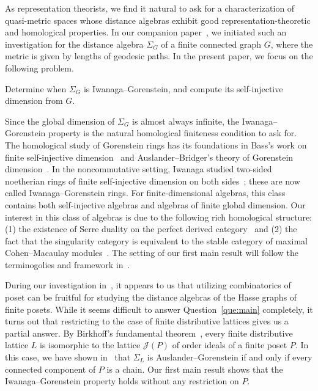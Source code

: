 \documentclass[a4paper,leqno]{amsart}
\begin{document}
As representation theorists, we find it natural to ask for a characterization of quasi-metric spaces whose distance algebras exhibit good representation-theoretic and homological properties. 
In our companion paper~\cite{CX26}, we initiated such an investigation for the distance algebra $\Sigma_G$ of a finite connected graph $G$, where the metric is given by lengths of geodesic paths. 
In the present paper, we focus on the following problem.

\begin{que}\label{que:main}
Determine when $\Sigma_G$ is Iwanaga--Gorenstein, and compute its self-injective dimension from $G$.
\end{que}

Since the global dimension of $\Sigma_G$ is almost always infinite, the Iwanaga--Gorenstein property is the natural homological finiteness condition to ask for. The homological study of Gorenstein rings has its foundations in Bass's work on finite self-injective dimension~\cite{Bas63} and Auslander--Bridger's theory of Gorenstein dimension~\cite{AB69}.  In the noncommutative setting, Iwanaga studied two-sided noetherian rings of finite self-injective dimension on both sides~\cite{Iwa79}; these are now called Iwanaga--Gorenstein rings. 
For finite-dimensional algebras, this class contains both self-injective algebras and algebras of finite global dimension.  Our interest in this class of algebras is due to the following rich homological structure: (1) the existence of Serre duality on the perfect derived category~\cite{Hap91} and (2) the fact that the singularity category is equivalent to the stable category of maximal Cohen--Macaulay modules~\cite{Buc21,Hap91,Orl04}.
The setting of our first main result will follow the terminogolies and framework in~\cite{IK22,GIK23}.


During our investigation in~\cite{CX26}, it appears to us that utilizing combinatorics of poset can be fruitful for studying the distance algebras of the Hasse graphs of finite posets.
While it seems difficult to answer Question~\ref{que:main} completely, it turns out that restricting to the case of finite distributive lattices gives us a partial answer.
By Birkhoff's fundamental theorem~\cite{Bir37}, every finite distributive lattice $L$ is isomorphic to the lattice $\mathcal J(P)$ of order ideals of a finite poset $P$.  In this case, we have shown in~\cite{CX26} that $\Sigma_L$ is Auslander--Gorenstein if and only if every connected component of $P$ is a chain. 
Our first main result shows that the Iwanaga--Gorenstein property holds without any restriction on $P$.
\end{document}
